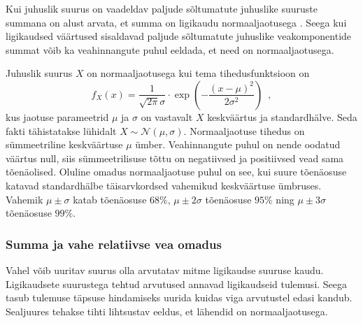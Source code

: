 Kui juhuslik suurus on vaadeldav paljude sõltumatute juhuslike suuruste summana on alust arvata, et summa on ligikaudu normaaljaotusega \cite{tõenäosusteooria-algkursus}. Seega kui ligikaudsed väärtused sisaldavad paljude sõltumatute juhuslike veakomponentide summat võib ka veahinnangute puhul eeldada, et need on normaaljaotusega.

Juhuslik suurus $X$ on normaaljaotusega kui tema tihedusfunktsioon on
\begin{equation*}
    f_X(x)=\frac{1}{\sqrt{2\pi}\sigma}\cdot\exp{\left(-\frac{(x-\mu)^2}{2\sigma^2}\right)} \enspace,
\end{equation*}
kus jaotuse parameetrid $\mu$ ja $\sigma$ on vastavalt $X$ keskväärtus ja standardhälve. Seda fakti tähistatakse lühidalt $X\sim\mathcal{N}(\mu,\sigma)$. Normaaljaotuse tihedus on sümmeetriline keskväärtuse $\mu$ ümber. Veahinnangute puhul on nende oodatud väärtus null, siis sümmeetrilisuse tõttu on negatiivsed ja positiivsed vead sama tõenäolised. Oluline omadus normaaljaotuse puhul on see, kui suure tõenäosuse katavad standardhälbe täisarvkordsed vahemikud keskväärtuse ümbruses. Vahemik $\mu\pm\sigma$ katab tõenäosuse $68\%$, $\mu\pm2\sigma$ tõenäosuse $95\%$ ning $\mu\pm3\sigma$ tõenäosuse $99\%$.

\subsubsection{Summa ja vahe relatiivse vea omadus}
Vahel võib uuritav suurus olla arvutatav mitme ligikaudse suuruse kaudu. Ligikaudsete suurustega tehtud arvutused annavad ligikaudseid tulemusi. Seega tasub tulemuse täpsuse hindamiseks uurida kuidas viga arvutustel edasi kandub. Sealjuures tehakse tihti lihtsustav eeldus, et lähendid on normaaljaotusega.

